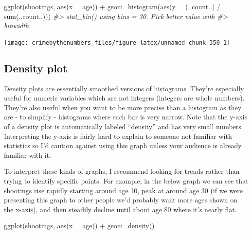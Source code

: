 \documentclass[
]{krantz}
\makeatletter
\newenvironment{Shaded}{\begin{snugshade}}{\end{snugshade}}
\newcommand{\AttributeTok}[1]{\textcolor[rgb]{0.61,0.61,0.61}{#1}}
\newcommand{\CommentTok}[1]{\textcolor[rgb]{0.37,0.37,0.37}{\textit{#1}}}
\newcommand{\FunctionTok}[1]{\textcolor[rgb]{0,0,0}{#1}}
\newcommand{\NormalTok}[1]{#1}
\newcommand{\SpecialCharTok}[1]{\textcolor[rgb]{0,0,0}{#1}}
\newenvironment{kframe}{%
\medskip{}
\setlength{\fboxsep}{.8em}
 \def\at@end@of@kframe{}%
 \ifinner\ifhmode%
  \def\at@end@of@kframe{\end{minipage}}%
  \begin{minipage}{\columnwidth}%
 \fi\fi%
 \def\FrameCommand##1{\hskip\@totalleftmargin \hskip-\fboxsep
 \colorbox{shadecolor}{##1}\hskip-\fboxsep
     \hskip-\linewidth \hskip-\@totalleftmargin \hskip\columnwidth}%
 \MakeFramed {\advance\hsize-\width
   \@totalleftmargin\z@ \linewidth\hsize
   \@setminipage}}%
 {\par\unskip\endMakeFramed%
 \at@end@of@kframe}
\renewenvironment{Shaded}{\begin{kframe}}{\end{kframe}}
\makeatother
\begin{document}
\begin{Shaded}
\begin{Highlighting}[]
\FunctionTok{ggplot}\NormalTok{(shootings, }\FunctionTok{aes}\NormalTok{(}\AttributeTok{x =}\NormalTok{ age)) }\SpecialCharTok{+}
  \FunctionTok{geom\_histogram}\NormalTok{(}\FunctionTok{aes}\NormalTok{(}\AttributeTok{y =}\NormalTok{ (..count..) }\SpecialCharTok{/} \FunctionTok{sum}\NormalTok{(..count..)))}
\CommentTok{\#\textgreater{} \textasciigrave{}stat\_bin()\textasciigrave{} using \textasciigrave{}bins = 30\textasciigrave{}. Pick better value with}
\CommentTok{\#\textgreater{} \textasciigrave{}binwidth\textasciigrave{}.}
\end{Highlighting}
\end{Shaded}

\begin{center}\texttt{[image: crimebythenumbers\_files/figure-latex/unnamed-chunk-350-1]} \end{center}

\hypertarget{density-plot}{%
\subsection{Density plot}\label{density-plot}}

Density plots are essentially smoothed versions of
histograms. They're especially useful for numeric variables
which are not integers (integers are whole numbers). They're
also useful when you want to be more precise than a
histogram as they are - to simplify - histograms where each
bar is very narrow. Note that the y-axis of a density plot
is automatically labeled ``density'' and has very small
numbers. Interpreting the y-axis is fairly hard to explain
to someone not familiar with statistics so I'd caution
against using this graph unless your audience is already
familiar with it.

To interpret these kinds of graphs, I recommend looking for
trends rather than trying to identify specific points. For
example, in the below graph we can see that shootings rise
rapidly starting around age 10, peak at around age 30 (if we
were presenting this graph to other people we'd probably
want more ages shown on the x-axis), and then steadily
decline until about age 80 where it's nearly flat.

\begin{Shaded}
\begin{Highlighting}[]
\FunctionTok{ggplot}\NormalTok{(shootings, }\FunctionTok{aes}\NormalTok{(}\AttributeTok{x =}\NormalTok{ age)) }\SpecialCharTok{+}
  \FunctionTok{geom\_density}\NormalTok{()}
\end{Highlighting}
\end{Shaded}
\end{document}

